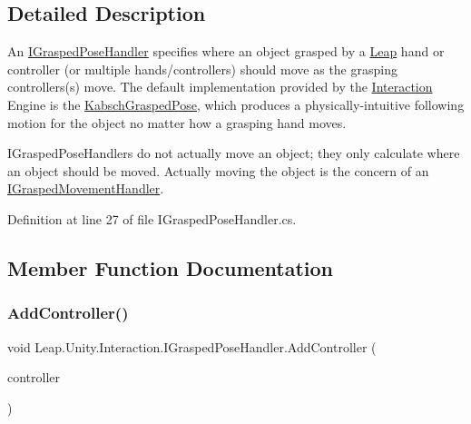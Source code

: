\subsection{Detailed Description}
An \mbox{\hyperlink{interface_leap_1_1_unity_1_1_interaction_1_1_i_grasped_pose_handler}{I\+Grasped\+Pose\+Handler}} specifies where an object grasped by a \mbox{\hyperlink{namespace_leap_1_1_unity_1_1_leap}{Leap}} hand or controller (or multiple hands/controllers) should move as the grasping controllers(s) move. The default implementation provided by the \mbox{\hyperlink{namespace_leap_1_1_unity_1_1_interaction}{Interaction}} Engine is the \mbox{\hyperlink{class_leap_1_1_unity_1_1_interaction_1_1_kabsch_grasped_pose}{Kabsch\+Grasped\+Pose}}, which produces a physically-\/intuitive following motion for the object no matter how a grasping hand moves. 

I\+Grasped\+Pose\+Handlers do not actually move an object; they only calculate where an object should be moved. Actually moving the object is the concern of an \mbox{\hyperlink{interface_leap_1_1_unity_1_1_interaction_1_1_i_grasped_movement_handler}{I\+Grasped\+Movement\+Handler}}. 

Definition at line 27 of file I\+Grasped\+Pose\+Handler.\+cs.



\subsection{Member Function Documentation}
\mbox{\label{interface_leap_1_1_unity_1_1_interaction_1_1_i_grasped_pose_handler_ad6b297cf90c878a95ca69901180ab4ce}} 
\subsubsection{\texorpdfstring{AddController()}{AddController()}}
{\footnotesize\ttfamily void Leap.\+Unity.\+Interaction.\+I\+Grasped\+Pose\+Handler.\+Add\+Controller (\begin{DoxyParamCaption}\item[{\mbox{\hyperlink{class_leap_1_1_unity_1_1_interaction_1_1_interaction_controller}{Interaction\+Controller}}}]{controller }\end{DoxyParamCaption})}



